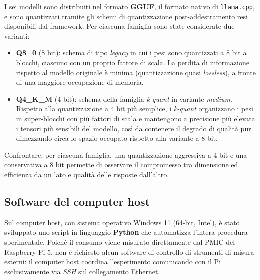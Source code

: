 I sei modelli sono distribuiti nel formato \textbf{GGUF}, il formato nativo di
\texttt{llama.cpp}, e sono quantizzati tramite gli schemi di quantizzazione
post-addestramento resi disponibili dal framework. Per ciascuna famiglia sono
state considerate due varianti:
\begin{itemize}
    \item \textbf{Q8\_0} (8 bit): schema di tipo \emph{legacy} in cui i pesi
    sono quantizzati a 8 bit a blocchi, ciascuno con un proprio fattore di scala.
    La perdita di informazione rispetto al modello originale è minima
    (quantizzazione quasi \emph{lossless}), a fronte di una maggiore occupazione
    di memoria.
    \item \textbf{Q4\_K\_M} (4 bit): schema della famiglia \emph{k-quant} in
    variante \emph{medium}. Rispetto alla quantizzazione a 4 bit più semplice, i
    \emph{k-quant} organizzano i pesi in super-blocchi con più fattori di scala e
    mantengono a precisione più elevata i tensori più sensibili del modello, così
    da contenere il degrado di qualità pur dimezzando circa lo spazio occupato
    rispetto alla variante a 8 bit.
\end{itemize}
Confrontare, per ciascuna famiglia, una quantizzazione aggressiva a 4 bit e una
conservativa a 8 bit permette di osservare il compromesso tra dimensione ed
efficienza da un lato e qualità delle risposte dall'altro.

\subsection{Software del computer host}

Sul computer host, con sistema operativo Windows 11 (64-bit, Intel), è stato
sviluppato uno script in linguaggio \textbf{Python} che automatizza l'intera
procedura sperimentale. Poiché il consumo viene misurato direttamente dal PMIC
del Raspberry Pi 5, non è richiesto alcun software di controllo di strumenti di
misura esterni: il computer host coordina l'esperimento comunicando con il Pi
esclusivamente via \textit{SSH} sul collegamento Ethernet.

